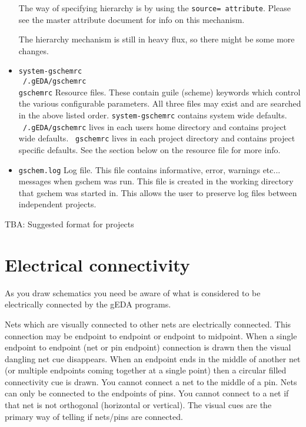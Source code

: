 \documentclass{article}
\begin{document}
\begin{itemize}
  The way of specifying hierarchy is by using the {\tt source= attribute}.
  Please see the master attribute document for info on this mechanism.
  
  The hierarchy mechanism is still in heavy flux, so there might be
  some more changes.
  
  \item {\tt system-gschemrc}\\ {\tt ~/.gEDA/gschemrc}\\ {\tt gschemrc}
  Resource files.  These contain guile (scheme) keywords which control
  the various configurable parameters.  All three files may exist and
  are searched in the above listed order.  {\tt system-gschemrc}
  contains system wide defaults.  {\tt ~/.gEDA/gschemrc} lives in each
  users home directory and contains project wide defaults.  {\tt
    gschemrc} lives in each project directory and contains project
  specific defaults.  See the section below on the resource file for
  more info.
  
\item {\tt gschem.log} Log file.  This file contains informative,
  error, warnings etc... messages when gschem was run.  This file is
  created in the working directory that gschem was started in.  This
  allows the user to preserve log files between independent projects.

\end{itemize}
        TBA: Suggested format for projects

        

\section{Electrical connectivity }
As you draw schematics you need be aware of what is considered
to be electrically connected by the gEDA programs.

Nets which are visually connected to other nets are electrically
connected.  This connection may be endpoint to endpoint or endpoint to
midpoint.  When a single endpoint to endpoint (net or pin endpoint)
connection is drawn then the visual dangling net cue disappears.  When
an endpoint ends in the middle of another net (or multiple endpoints
coming together at a single point) then a circular filled connectivity
cue is drawn.  You cannot connect a net to the middle of a pin.  Nets
can only be connected to the endpoints of pins. You cannot connect to
a net if that net is not orthogonal (horizontal or vertical).  The
visual cues are the primary way of telling if nets/pins are connected.
\end{document}
